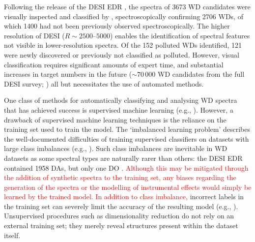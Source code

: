 \documentclass[fleqn,usenatbib]{mnras}
\newcommand{\red}[1]{\textcolor{red}{#1}}
\begin{document}
Following the release of the DESI EDR \citep{desiedr}, the spectra of 3673 WD candidates were visually inspected and classified by \citet{manser24}, spectroscopically confirming 2706 WDs, of which 1400 had not been previously observed spectroscopically.
The higher resolution of DESI ($R\sim2500$--$5000$) enables the identification of spectral features not visible in lower-resolution spectra.
Of the 152 polluted WDs identified, 121 were newly discovered or previously not classified as polluted.
However, visual classification requires significant amounts of expert time, and substantial increases in target numbers in the future ($\sim70\,000$ WD candidates from the full DESI survey; \citealt{cooper23}) all but necessitates the use of automated methods.

One class of methods for automatically classifying and analysing WD spectra that has achieved success is supervised machine learning (e.g., \citealt{yang20, tan23, garciazamora23, vincent23, vincent24}).
However, a drawback of supervised machine learning techniques is the reliance on the training set used to train the model.
The `imbalanced learning problem' describes the well-documented difficulties of training supervised classifiers on datasets with large class imbalances (e.g., \citealt{he09, johnson19}).
Such class imbalances are inevitable in WD datasets as some spectral types are naturally rarer than others: the DESI EDR contained 1958 DAs, but only one DO \citep{manser24}.
\red{Although this may be mitigated through the addition of synthetic spectra to the training set, any biases regarding the generation of the spectra or the modelling of instrumental effects would simply be learned by the trained model.
In addition to class imbalance,} incorrect labels in the training set can severely limit the accuracy of the resulting model (e.g., \citealt{frenay14}).
Unsupervised procedures such as dimensionality reduction do not rely on an external training set; they merely reveal structures present within the dataset itself.
\end{document}
